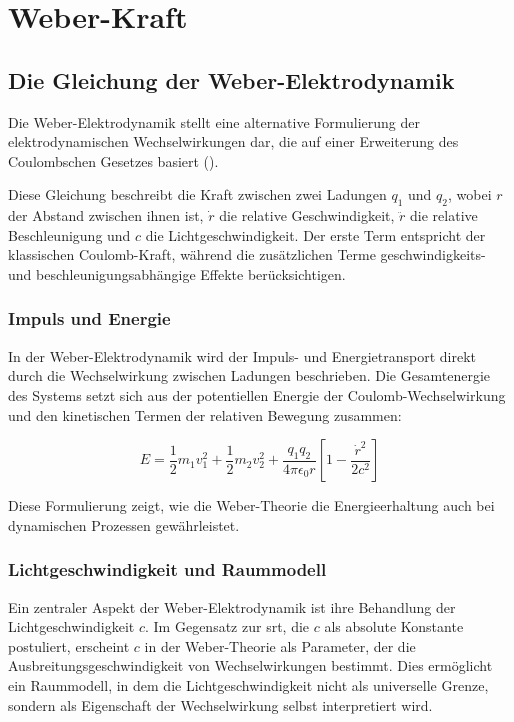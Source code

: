 \chapter{Weber-Kraft}
\section{Die Gleichung der Weber-Elektrodynamik}
Die Weber-Elektrodynamik stellt eine alternative Formulierung der elektrodynamischen Wechselwirkungen dar, die auf einer Erweiterung des Coulombschen Gesetzes basiert ().

Diese Gleichung beschreibt die Kraft zwischen zwei Ladungen $q_1$ und $q_2$, wobei $r$ der Abstand zwischen ihnen ist, $\dot{r}$ die relative Geschwindigkeit, $\ddot{r}$ die relative
Beschleunigung und $c$ die Lichtgeschwindigkeit. Der erste Term entspricht der klassischen Coulomb-Kraft, während die zusätzlichen Terme geschwindigkeits- und beschleunigungsabhängige
Effekte berücksichtigen.

\subsection{Impuls und Energie}
In der Weber-Elektrodynamik wird der Impuls- und Energietransport direkt durch die Wechselwirkung zwischen Ladungen beschrieben. Die Gesamtenergie des Systems setzt sich aus der potentiellen
Energie der Coulomb-Wechselwirkung und den kinetischen Termen der relativen Bewegung zusammen:

\[
    E = \frac{1}{2} m_1 v_1^2 + \frac{1}{2} m_2 v_2^2 + \frac{q_1 q_2}{4 \pi \epsilon_0 r} \left[ 1 - \frac{\dot{r}^2}{2c^2} \right]
\]

Diese Formulierung zeigt, wie die Weber-Theorie die Energieerhaltung auch bei dynamischen Prozessen gewährleistet.

\subsection{Lichtgeschwindigkeit und Raummodell}
Ein zentraler Aspekt der Weber-Elektrodynamik ist ihre Behandlung der Lichtgeschwindigkeit $c$. Im Gegensatz zur \gls{srt}, die $c$ als absolute Konstante postuliert,
erscheint $c$ in der Weber-Theorie als Parameter, der die Ausbreitungsgeschwindigkeit von Wechselwirkungen bestimmt. Dies ermöglicht ein Raummodell, in dem die Lichtgeschwindigkeit
nicht als universelle Grenze, sondern als Eigenschaft der Wechselwirkung selbst interpretiert wird.

